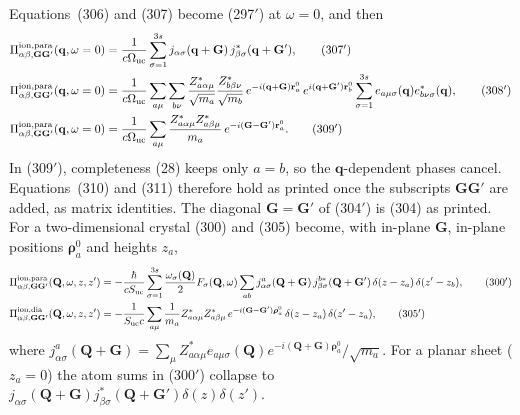 Equations~(306) and (307) become (297$'$) at $\omega=0$, and then
\begin{align}
\Pi^{\rm ion,para}_{\alpha\beta,\mathbf G\mathbf G'}(\mathbf q,\omega=0)&=\frac{1}{c\Omega_{\rm uc}}\sum_{\sigma=1}^{3s}j_{\alpha\sigma}(\mathbf q+\mathbf G)\,j^*_{\beta\sigma}(\mathbf q+\mathbf G'),\tag{307$'$}\\
\Pi^{\rm ion,para}_{\alpha\beta,\mathbf G\mathbf G'}(\mathbf q,\omega=0)&=\frac{1}{c\Omega_{\rm uc}}\sum_{a\mu}\sum_{b\nu}\frac{Z^*_{a\alpha\mu}}{\sqrt{m_a}}\frac{Z^*_{b\beta\nu}}{\sqrt{m_b}}\,e^{-i(\mathbf q+\mathbf G)\mathbf r^0_a}\,e^{i(\mathbf q+\mathbf G')\mathbf r^0_b}\sum_{\sigma=1}^{3s}e_{a\mu\sigma}(\mathbf q)e^*_{b\nu\sigma}(\mathbf q),\tag{308$'$}\\
\Pi^{\rm ion,para}_{\alpha\beta,\mathbf G\mathbf G'}(\mathbf q,\omega=0)&=\frac{1}{c\Omega_{\rm uc}}\sum_{a\mu}\frac{Z^*_{a\alpha\mu}Z^*_{a\beta\mu}}{m_a}\,e^{-i(\mathbf G-\mathbf G')\mathbf r^0_a}.\tag{309$'$}
\end{align}
In (309$'$), completeness (28) keeps only $a=b$, so the $\mathbf q$-dependent phases cancel. Equations~(310) and (311) therefore hold as printed once the subscripts $\mathbf G\mathbf G'$ are added, as matrix identities. The diagonal $\mathbf G=\mathbf G'$ of (304$'$) is (304) as printed. For a two-dimensional crystal (300) and (305) become, with in-plane $\mathbf G$, in-plane positions $\boldsymbol\rho^0_a$ and heights $z_a$,
\begin{align}
\Pi^{\rm ion,para}_{\alpha\beta,\mathbf G\mathbf G'}(\mathbf Q,\omega,z,z')&=-\frac{\hbar}{cS_{\rm uc}}\sum_{\sigma=1}^{3s}\frac{\omega_\sigma(\mathbf Q)}{2}F_\sigma(\mathbf Q,\omega)\sum_{ab}j^a_{\alpha\sigma}(\mathbf Q+\mathbf G)\,j^{b*}_{\beta\sigma}(\mathbf Q+\mathbf G')\,\delta(z-z_a)\,\delta(z'-z_b),\tag{300$'$}\\
\Pi^{\rm ion,dia}_{\alpha\beta,\mathbf G\mathbf G'}(\mathbf Q,\omega,z,z')&=-\frac{1}{S_{\rm uc}c}\sum_{a\mu}\frac{1}{m_a}Z^*_{a\alpha\mu}Z^*_{a\beta\mu}\,e^{-i(\mathbf G-\mathbf G')\boldsymbol\rho^0_a}\,\delta(z-z_a)\,\delta(z'-z_a),\tag{305$'$}
\end{align}
where $j^a_{\alpha\sigma}(\mathbf Q+\mathbf G)=\sum_\mu Z^*_{a\alpha\mu}e_{a\mu\sigma}(\mathbf Q)e^{-i(\mathbf Q+\mathbf G)\boldsymbol\rho^0_a}/\sqrt{m_a}$. For a planar sheet ($z_a=0$) the atom sums in (300$'$) collapse to $j_{\alpha\sigma}(\mathbf Q+\mathbf G)j^*_{\beta\sigma}(\mathbf Q+\mathbf G')\delta(z)\delta(z')$.

